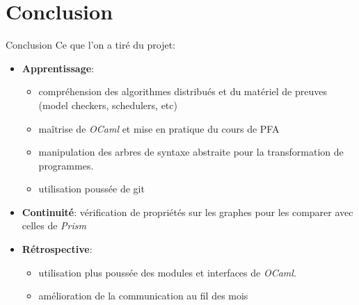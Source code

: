 \documentclass[11pt]{beamer}
\begin{document}
\section{Conclusion}
\begin{frame}{Conclusion}
Ce que l'on a tiré du projet:
\begin{itemize}
  \item \textbf{Apprentissage}:
  \begin{itemize}
    \item compréhension des algorithmes distribués et du matériel de preuves (model checkers, schedulers, etc)
    \item maîtrise de \textit{OCaml} et mise en pratique du cours de PFA
    \item manipulation des arbres de syntaxe abstraite pour la transformation de programmes.
    \item utilisation poussée de git
  \end{itemize}
  \item \textbf{Continuité}: vérification de propriétés sur les graphes pour les comparer avec celles de \textit{Prism}
  \item \textbf{Rétrospective}:
  \begin{itemize}
    \item utilisation plus poussée des modules et interfaces de \textit{OCaml}. 
    \item amélioration de la communication au fil des mois
  \end{itemize}   
\end{itemize}
\end{frame}
\end{document}
